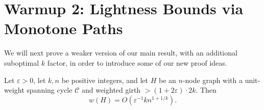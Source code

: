 \documentclass{theoretics}
\newcommand{\eps}{\varepsilon}
\newcommand{\cee}{\mathcal{C}}
\begin{document}









\section{Warmup 2: Lightness Bounds via Monotone Paths \label{sec:warmup}}

We will next prove a weaker version of our main result, with an additional suboptimal $k$ factor, in order to introduce some of our new proof ideas.
\begin{theorem} [Warmup] \label{thm:warmupmain}
Let $\eps>0$, let $k, n$ be positive integers, and let $H$ be an $n$-node graph with a unit-weight spanning cycle $\cee$ and weighted girth $>(1+2\eps) \cdot 2k$.
Then
$$w(H) = O\left( \eps^{-1} k n^{1+1/k} \right).$$
\end{theorem}
\end{document}

